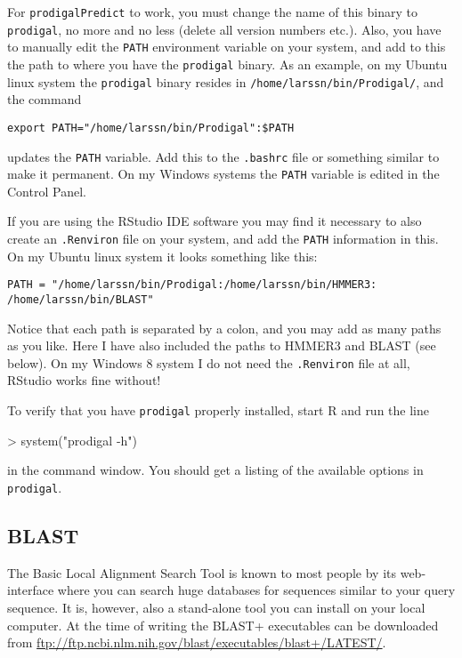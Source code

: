 \documentclass{article}
\begin{document}
For \texttt{prodigalPredict} to work, you must change the name of this binary to \texttt{prodigal}, no more and no less (delete all version numbers etc.). Also, you have to manually edit the \texttt{PATH} environment variable on your system, and add to this the path to where you have the \texttt{prodigal} binary. As an example, on my Ubuntu linux system the \texttt{prodigal} binary resides in \texttt{/home/larssn/bin/Prodigal/}, and the command
\begin{verbatim}
export PATH="/home/larssn/bin/Prodigal":$PATH
\end{verbatim}
updates the \texttt{PATH} variable. Add this to the \texttt{.bashrc} file or something similar to make it permanent. On my Windows systems the \texttt{PATH} variable is edited in the Control Panel.

If you are using the RStudio IDE software you may find it necessary to also create an \texttt{.Renviron} file on your system, and add the \texttt{PATH} information in this. On my Ubuntu linux system it looks something like this:
\begin{verbatim}
PATH = "/home/larssn/bin/Prodigal:/home/larssn/bin/HMMER3:
/home/larssn/bin/BLAST"
\end{verbatim}
Notice that each path is separated by a colon, and you may add as many paths as you like. Here I have also included the paths to HMMER3 and BLAST (see below). On my Windows 8 system I do not need the \texttt{.Renviron} file at all, RStudio works fine without!

To verify that you have \texttt{prodigal} properly installed, start R and run the line
\begin{Schunk}
\begin{Sinput}
> system("prodigal -h")
\end{Sinput}
\end{Schunk}
in the command window. You should get a listing of the available options in \texttt{prodigal}.


\subsection{BLAST}
The Basic Local Alignment Search Tool is known to most people by its web-interface where you can search huge databases for sequences similar to your query sequence. It is, however, also a stand-alone tool you can install on your local computer. At the time of writing the BLAST+ executables can be downloaded from \url{ftp://ftp.ncbi.nlm.nih.gov/blast/executables/blast+/LATEST/}. 
\end{document}
